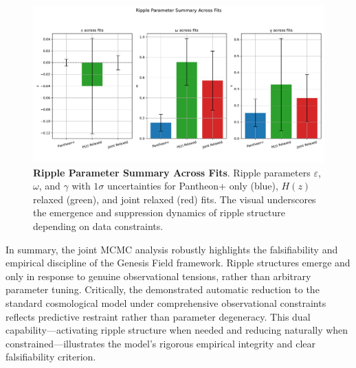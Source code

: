 \begin{figure}[htpb]
\centering
\includegraphics[width=\textwidth]{figures/ripple_parameter_summary.pdf}
\caption{\textbf{Ripple Parameter Summary Across Fits}. Ripple parameters $\varepsilon$, $\omega$, and $\gamma$ with $1\sigma$ uncertainties for Pantheon+ only (blue), $H(z)$ relaxed (green), and joint relaxed (red) fits. The visual underscores the emergence and suppression dynamics of ripple structure depending on data constraints.}
\label{fig:ripple_summary}
\end{figure}

In summary, the joint MCMC analysis robustly highlights the falsifiability and empirical discipline of the Genesis Field framework. Ripple structures emerge and only in response to genuine observational tensions, rather than arbitrary parameter tuning. Critically, the demonstrated automatic reduction to the standard cosmological model under comprehensive observational constraints reflects predictive restraint rather than parameter degeneracy. This dual capability—activating ripple structure when needed and reducing naturally when constrained—illustrates the model's rigorous empirical integrity and clear falsifiability criterion.

